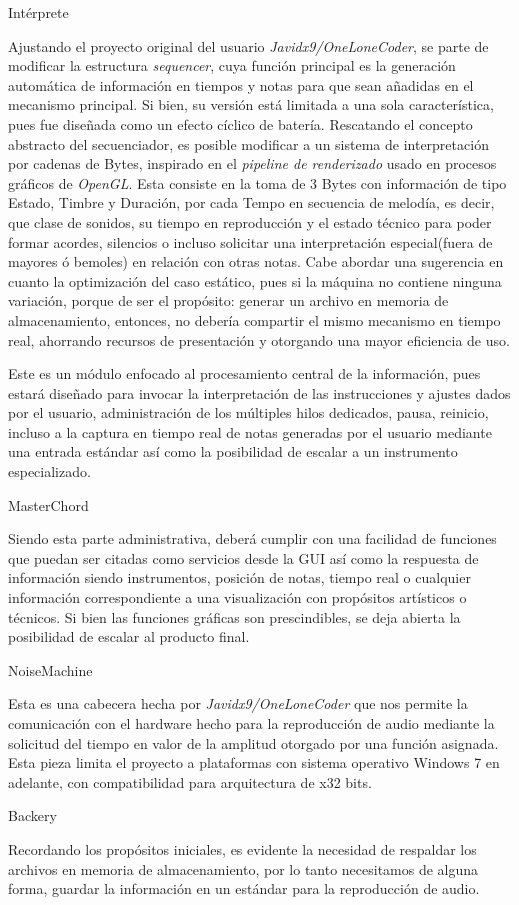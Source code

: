 \documentclass{book}
\begin{document}
	{\large Intérprete}\par
	Ajustando el proyecto original del usuario \emph{Javidx9/OneLoneCoder}, se parte de modificar la estructura \emph{sequencer}, cuya función principal es la generación automática de información en tiempos y notas para que sean añadidas en el mecanismo principal. Si bien, su versión está limitada a una sola característica, pues fue diseñada como un efecto cíclico de batería. Rescatando el concepto abstracto del secuenciador, es posible modificar a un sistema de interpretación por cadenas de Bytes, inspirado en el \emph{pipeline de renderizado} usado en procesos gráficos de \emph{OpenGL}. Esta consiste en la toma de 3 Bytes con información de tipo Estado, Timbre y Duración, por cada Tempo en secuencia de melodía, es decir, que clase de sonidos, su tiempo en reproducción y el estado técnico para poder formar acordes, silencios o incluso solicitar una interpretación especial(fuera de mayores ó bemoles) en relación con otras notas. Cabe abordar una sugerencia en cuanto la optimización del caso estático, pues si la máquina no contiene ninguna variación, porque de ser el propósito: generar un archivo en memoria de almacenamiento, entonces, no debería compartir el mismo mecanismo en tiempo real, ahorrando recursos de presentación y otorgando una mayor eficiencia de uso.\par
	
	\par
	Este es un módulo enfocado al procesamiento central de la información, pues estará diseñado para invocar la interpretación de las instrucciones y ajustes dados por el usuario, administración de los múltiples hilos dedicados, pausa, reinicio, incluso a la captura en tiempo real de notas generadas por el usuario mediante una entrada estándar así como la posibilidad de escalar a un instrumento especializado.\par
	{\large MasterChord}\par
	Siendo esta parte administrativa, deberá cumplir con una facilidad de funciones que puedan ser citadas como servicios desde la GUI así como la respuesta de información siendo instrumentos, posición de notas, tiempo real o cualquier información correspondiente a una visualización con propósitos artísticos o técnicos. Si bien las funciones gráficas son prescindibles, se deja abierta la posibilidad de escalar al producto final.\par
	{\large NoiseMachine}\par
	Esta es una cabecera hecha por \emph{Javidx9/OneLoneCoder} que nos permite la comunicación con el hardware hecho para la reproducción de audio mediante la solicitud del tiempo en valor de la amplitud otorgado por una función asignada. Esta pieza limita el proyecto a plataformas con sistema operativo Windows 7 en adelante, con compatibilidad para arquitectura de x32 bits.\par
	{\large Backery}\par
	Recordando los propósitos iniciales, es evidente la necesidad de respaldar los archivos en memoria de almacenamiento, por lo tanto necesitamos de alguna forma, guardar la información en un estándar para la reproducción de audio.\par
	
\end{document}
